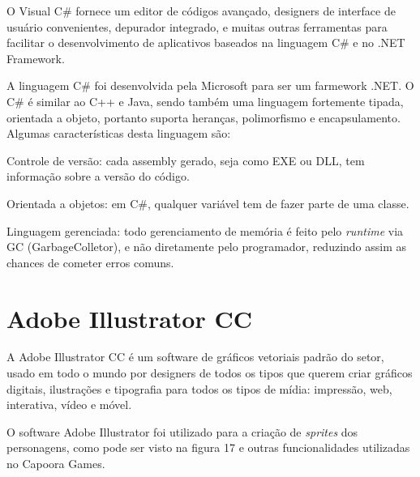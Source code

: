 O Visual C\# fornece um editor de códigos avançado, designers de interface de usuário convenientes, depurador integrado, e muitas outras ferramentas para facilitar o desenvolvimento de aplicativos baseados na linguagem C\# e no .NET Framework. 

A linguagem C\# foi desenvolvida pela Microsoft para ser um farmework .NET. 
O C\# é similar ao C++ e Java, sendo também uma linguagem fortemente tipada, orientada a objeto, portanto suporta heranças, polimorfismo e encapsulamento. 
Algumas características desta linguagem são: 

\begin{alineascomponto}
	\item Controle de versão: cada assembly gerado, seja como EXE ou DLL, tem informação sobre a versão do código. 

	\item Orientada a objetos: em C\#, qualquer variável tem de fazer parte de uma classe.  

	\item Linguagem gerenciada: todo gerenciamento de memória é feito pelo \textit{runtime} via GC (GarbageColletor), e não diretamente pelo programador, reduzindo assim as chances de cometer erros comuns.
\end{alineascomponto}
\cite{mcs}

\section{Adobe Illustrator CC}
\label{sec:Adobe-Illustrato-CC}

A Adobe Illustrator CC é um software de gráficos vetoriais padrão do setor, usado em todo o mundo por designers de todos os tipos que querem criar gráficos digitais, ilustrações e tipografia para todos os tipos de mídia: impressão, web, interativa, vídeo e móvel. \cite{adb}

O software Adobe Illustrator foi utilizado para a criação de \textit{sprites} dos personagens, como pode ser visto na figura 17 e outras funcionalidades utilizadas no Capoora Games.

\begin{figure}[h!]
		\centering
	\end{figure}
	\pagebreak
